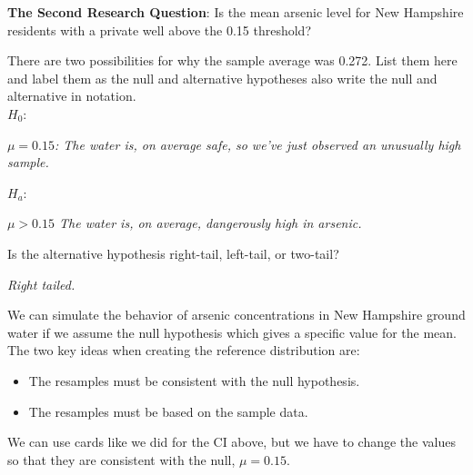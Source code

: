 {\bf The Second Research Question}: Is the mean arsenic level
for New Hampshire residents with a private well above the 0.15 threshold? 


  There are two possibilities for why the sample average
was 0.272.  List them here and label them as the null and alternative
hypotheses also write the null and alternative in notation.\\
$H_0:$ 
\begin{students}
  \vspace{1cm}
\end{students}
\begin{key}
  {\it   $ \mu = 0.15$:  The water is, on average safe, so we've just
  observed an unusually high sample.}
\end{key}

$H_a:$
\begin{students}
  \vspace{1cm}
\end{students}
\begin{key}

  {\it  $ \mu > 0.15$  The water is, on average, dangerously high in arsenic.}
\end{key}

Is the alternative hypothesis right-tail, left-tail, or two-tail?
\begin{students}
  \vspace{1cm}
\end{students}

\begin{key}
  {\it Right tailed.}
\end{key}

We can simulate the behavior of arsenic concentrations in New
Hampshire ground water if we assume the null hypothesis which gives a
specific value for the mean.  The two key ideas when creating the
reference distribution are:
\begin{itemize}
\item 
 The resamples must be consistent with the null hypothesis.
\item 
 The resamples must be based on the sample data.
\end{itemize}

  We can use cards like we did for the CI above,
but we have to change the values so that they are consistent with the
null, $\mu = 0.15$.

